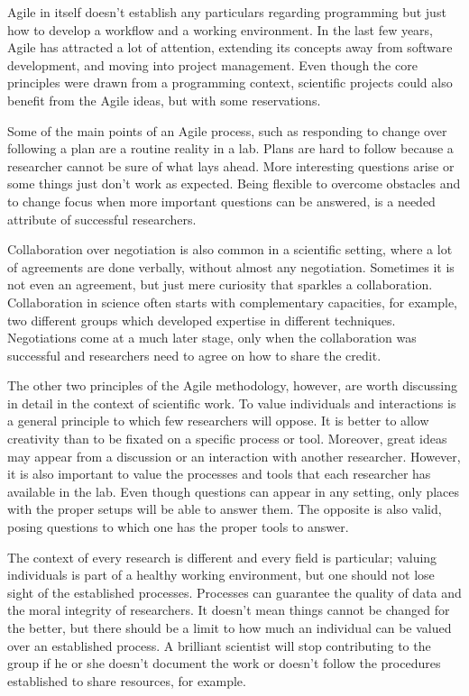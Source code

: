 Agile in itself doesn’t establish any particulars regarding programming but just how to develop a workflow and a working environment. In the last few years, Agile has attracted a lot of attention, extending its concepts away from software development, and moving into project management. Even though the core principles were drawn from a programming context, scientific projects could also benefit from the Agile ideas, but with some reservations.

Some of the main points of an Agile process, such as responding to change over following a plan are a routine reality in a lab. Plans are hard to follow because a researcher cannot be sure of what lays ahead. More interesting questions arise or some things just don’t work as expected. Being flexible to overcome obstacles and to change focus when more important questions can be answered, is a needed attribute of successful researchers.

Collaboration over negotiation is also common in a scientific setting, where a lot of agreements are done verbally, without almost any negotiation. Sometimes it is not even an agreement, but just mere curiosity that sparkles a collaboration. Collaboration in science often starts with complementary capacities, for example, two different groups which developed expertise in different techniques. Negotiations come at a much later stage, only when the collaboration was successful and researchers need to agree on how to share the credit.

The other two principles of the Agile methodology, however, are worth discussing in detail in the context of scientific work. To value individuals and interactions is a general principle to which few researchers will oppose. It is better to allow creativity than to be fixated on a specific process or tool. Moreover, great ideas may appear from a discussion or an interaction with another researcher. However, it is also important to value the processes and tools that each researcher has available in the lab. Even though questions can appear in any setting, only places with the proper setups will be able to answer them. The opposite is also valid, posing questions to which one has the proper tools to answer.

The context of every research is different and every field is particular; valuing individuals is part of a healthy working environment, but one should not lose sight of the established processes. Processes can guarantee the quality of data and the moral integrity of researchers. It doesn’t mean things cannot be changed for the better, but there should be a limit to how much an individual can be valued over an established process. A brilliant scientist will stop contributing to the group if he or she doesn’t document the work or doesn’t follow the procedures established to share resources, for example.

